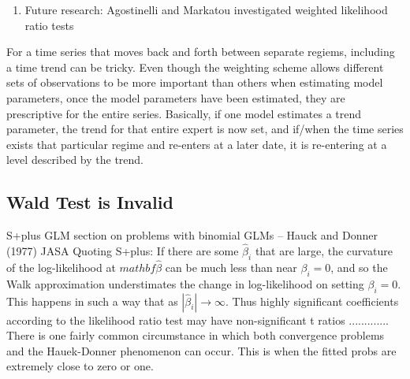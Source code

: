 \documentclass[12pt]{article}
\begin{document}

\begin{enumerate}
\item Future research: Agostinelli and Markatou \cite{AgostinelliMarkatou} investigated weighted likelihood ratio tests
\end{enumerate}

For a time series that moves back and forth between separate regiems, including
a time trend can be tricky. Even though the weighting scheme allows different
sets of observations to be more important than others when estimating model
parameters, once the model parameters have been estimated, they are prescriptive
for the entire series. Basically, if one model estimates a trend parameter, the
trend for that entire expert is now set, and if/when the time series exists that
particular regime and re-enters at a later date, it is re-entering at a level
described by the trend.

\subsection{Wald Test is Invalid}
S+plus GLM section on problems with binomial GLMs
  -- Hauck and Donner (1977) JASA \cite{HauckDonner} Quoting S+plus: If there are
  some $\hat{\beta}_{i}$ that are large, the curvature of the log-likelihood at
  $mathbf{\hat{\beta}}$ can be much less than near $\beta_{i}=0$, and so the Walk
  approximation understimates the change in log-likelihood on setting $\beta_{i}=0$.
  This happens in such a way that as $|\hat{\beta}_{i}| \rightarrow \infty$. Thus
  highly significant coefficients according to the likelihood ratio test may have
  non-significant t ratios ............. There is one fairly common circumstance
  in which both convergence problems and the Hauek-Donner phenomenon can occur.
  This is when the fitted probs are extremely close to zero or one.
\end{document}
